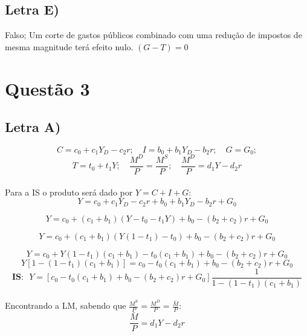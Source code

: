 \documentclass{article}
\begin{document}
\subsection*{Letra E)}
Falso; Um corte de gastos públicos combinado com uma redução de impostos de mesma magnitude terá efeito nulo. $(G-T)=0$

\clearpage %

\section*{Questão 3}
\subsection*{Letra A)}
$$ C = c_0 + c_1 Y_D - c_2 r; \quad
I = b_0 + b_1 Y_D - b_2 r; \quad G= G_0;$$
$$T=t_0+t_1 Y;\quad \frac{M^{D}}{P} = \frac{M^{S}}{P}; 
\quad \frac{M^{D}}{P} = d_1 Y - d_2 r $$
\\
Para a IS o produto será dado por $Y=C+I+G$:
\begin{equation}
Y = c_0 + c_1 Y_D - c_2 r + b_0 + b_1 Y_D - b_2 r + G_0
\end{equation}

\begin{equation}
Y = c_0 + (c_1+b_1)(Y-t_0-t_1Y) + b_0 - (b_2 +c_2) r + G_0
\end{equation}

\begin{equation}
Y = c_0 + (c_1+b_1)(Y(1-t_1)-t_0) + b_0 - (b_2 +c_2) r + G_0
\end{equation}

\begin{equation}\label{eq:3AY}
Y = c_0 + Y(1-t_1)(c_1+b_1)-t_0(c_1+b_1) + b_0 - (b_2 +c_2) r + G_0
\end{equation}
\begin{equation}
Y[1-(1-t_1)(c_1+b_1)] = c_0-t_0(c_1+b_1) + b_0 - (b_2 +c_2) r + G_0
\end{equation}
\begin{equation}
\textbf{IS:} \>\>\> Y= [c_0-t_0(c_1+b_1) + b_0 - (b_2 +c_2) r + G_0]\frac{1}{1-(1-t_1)(c_1+b_1)}
\end{equation}
\\
Encontrando a LM, sabendo que $\frac{M^S}{P}=\frac{M^D}{P}=\frac{\bar{M}}{P}$:
\begin{equation}
\frac{\bar{M}}{P} = d_1Y-d_2r
\end{equation}
\end{document}

